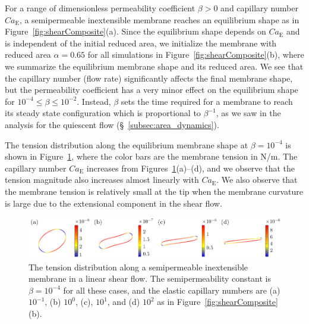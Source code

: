 \documentclass[prb,preprint,showpacs,preprintnumbers,amsmath,amssymb,longbibliography]{revtex4-1}
\newif\ifTikz
\begin{document}
For a range of dimensionless permeability coefficient $\beta>0$ and
capillary number $Ca_\mathrm{E}$, a semipermeable inextensible membrane reaches an
equilibrium shape as in Figure~\ref{fig:shearComposite}(a). Since the
equilibrium shape depends on $Ca_\mathrm{E}$ and is independent of the
initial reduced area, we initialize the membrane with reduced area
$\alpha = 0.65$ for all simulations in
Figure~\ref{fig:shearComposite}(b), where we summarize the equilibrium
membrane shape and its reduced area. We see that the capillary number
(flow rate) significantly affects the final membrane shape, but the
permeability coefficient has a very minor effect on the equilibrium
shape for $10^{-4}\le\beta\le 10^{-2}$. Instead, $\beta$ sets the time
required for a membrane to reach its steady state configuration which is
proportional to $\beta^{-1}$, as we saw in the analysis for the
quiescent flow (\S~\ref{subsec:area_dynamics}).

The tension distribution along the equilibrium membrane shape at
$\beta=10^{-4}$ is shown in Figure~\ref{fig:shearTensions}, where the
color bars are the membrane tension in N/m. The capillary number
$Ca_\mathrm{E}$ increases from Figures~\ref{fig:shearTensions}(a)--(d),
and we observe that the tension magnitude also increases almost linearly
with $Ca_\mathrm{E}$. We also observe that the membrane tension is
relatively small at the tip when the membrane curvature is large due to
the extensional component in the shear flow.
\begin{figure}[htp]
  \centering
  \ifTikz
  
  \else
  \includegraphics{figures/shearTensions.pdf}
  \fi
  \caption{\label{fig:shearTensions} The tension distribution along a
  semipermeable inextensible membrane in a linear shear flow. The semipermeability constant is
  $\beta = 10^{-4}$ for all these cases, and the elastic capillary
  numbers are (a) $10^{-1}$, (b) $10^{0}$, (c), $10^{1}$, and (d)
  $10^{2}$ as in Figure~\ref{fig:shearComposite}(b).}
\end{figure}
\end{document}
